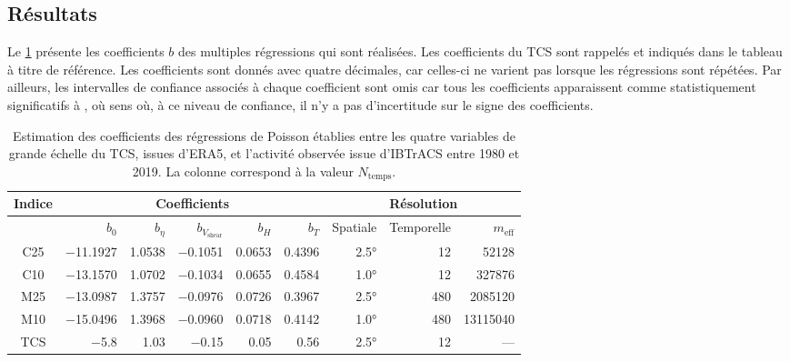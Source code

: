 \documentclass[../main.tex]{subfiles}
\begin{document}
\subsection{Résultats}

Le \cref{tab:fit_spatial_temporel} présente les coefficients $b$ des multiples régressions qui sont réalisées. Les coefficients du TCS sont rappelés et indiqués
dans le tableau à titre de référence. Les coefficients sont donnés avec quatre décimales, car celles-ci ne varient pas lorsque les régressions sont répétées.
Par ailleurs, les intervalles de confiance associés à chaque coefficient sont omis car tous les coefficients apparaissent comme statistiquement significatifs à
, où sens où, à ce niveau de confiance, il n'y a pas d'incertitude sur le signe des coefficients.

\begin{table}[htpb]
    \centering
    \caption{Estimation des coefficients des régressions de Poisson établies entre les quatre variables de grande échelle du TCS, issues d'ERA5, et l'activité
    observée issue d'IBTrACS entre 1980 et 2019. La colonne  correspond à la valeur $N_{\mathrm{temps}}$.}
    \label{tab:fit_spatial_temporel}

    \begin{tabular}{crrrrrrrr}
       \toprule\toprule 
       Indice & \multicolumn{5}{c}{Coefficients} & \multicolumn{3}{c}{Résolution}\\
       \midrule
              & $b_0$ & $b_{\eta}$ & $b_{V_{\mathrm{shear}}}$ & $b_H$ & $b_T$ & Spatiale     & Temporelle & $m_{\mathrm{eff}}$ \\
       \midrule
       C25    & \num{-11.1927} & \num{1.0538} & \num{-0.1051} & \num{0.0653}  & \num{0.4396} & \ang{2.5}  & 12  & \num{52128} \\
       C10    & \num{-13.1570} & \num{1.0702} & \num{-0.1034} & \num{0.0655}  & \num{0.4584} & \ang{1.0}  & 12  & \num{327876} \\ 
       M25    & \num{-13.0987} & \num{1.3757} & \num{-0.0976} & \num{0.0726}  & \num{0.3967} & \ang{2.5}  & 480 & \num{2085120} \\
       M10    & \num{-15.0496} & \num{1.3968} & \num{-0.0960} & \num{0.0718}  & \num{0.4142} & \ang{1.0}  & 480 & \num{13115040} \\
       \midrule
       TCS    & \num{-5.8}     & \num{1.03}   & \num{-0.15}   & \num{0.05}    & \num{0.56}   & \ang{2.5}  & 12  & --- \\
       \bottomrule
    \end{tabular}
\end{table}
\end{document}
